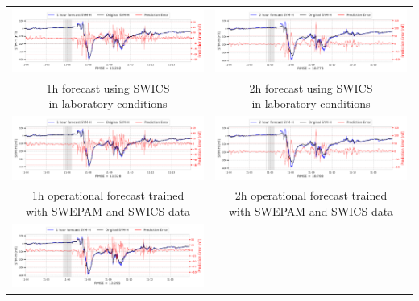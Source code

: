 \documentclass[draft,sw]{agutexSI2019}
\begin{document}
\begin{table}
\centering
\begin{tabular}{cc}
\includegraphics[width=0.49\linewidth]{paper_plots_shade/1h_swics/1h_swics_storm_37.png}
&
\includegraphics[width=0.49\linewidth]{paper_plots_shade/2h_swics/2h_swics_storm_37.png}
\\
\shortstack{1h forecast using SWICS\\ in laboratory conditions} & \shortstack{2h forecast using SWICS\\ in laboratory conditions}
\vspace*{12pt}
\\
\includegraphics[width=0.49\linewidth]{paper_plots_shade/1h_swics_rt/1h_swics_rt_storm_37.png}
&
\includegraphics[width=0.49\linewidth]{paper_plots_shade/2h_swics_rt/2h_swics_rt_storm_37.png}
\\
\shortstack{1h operational forecast trained\\ with SWEPAM and SWICS data} & \shortstack{2h operational forecast trained\\ with SWEPAM and SWICS data}
\vspace*{12pt}
\\
\includegraphics[width=0.49\linewidth]{paper_plots_shade/1h_swepam_rt/1h_swepam_rt_storm_37.png}

\end{tabular}
\end{table}
\end{document}
